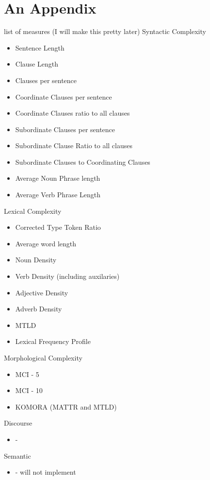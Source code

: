 \chapter{An Appendix}

list of measures (I will make this pretty later)
Syntactic Complexity
\begin{itemize}
    \item Sentence Length
    \item Clause Length
    \item Clauses per sentence
    \item Coordinate Clauses per sentence
    \item Coordinate Clauses ratio to all clauses
    \item Subordinate Clauses per sentence
    \item Subordinate Clause Ratio to all clauses
    \item Subordinate Clauses to Coordinating Clauses
    \item Average Noun Phrase length
    \item Average Verb Phrase Length
\end{itemize}

Lexical Complexity
\begin{itemize}
    \item Corrected Type Token Ratio
    \item Average word length
    \item Noun Density
    \item Verb Density (including auxilaries)
    \item Adjective Density
    \item Adverb Density
    \item MTLD
    \item Lexical Frequency Profile
\end{itemize}

Morphological Complexity
\begin{itemize}
    \item MCI - 5
    \item MCI - 10
    \item KOMORA (MATTR and MTLD)
\end{itemize}

Discourse
\begin{itemize}
    \item -
\end{itemize}

Semantic
\begin{itemize}
    \item - will not implement
\end{itemize}

